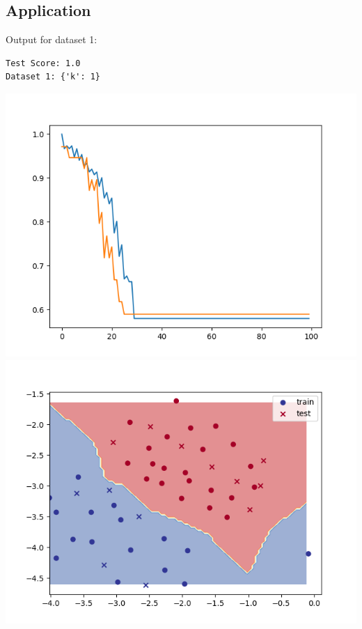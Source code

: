     \subsection{Application}
    Output for dataset 1:
    \begin{verbatim}
Test Score: 1.0
Dataset 1: {'k': 1}
    \end{verbatim}
    \includegraphics[width=\textwidth / 2]{plots/kmeans_loss_1}
    \includegraphics[width=\textwidth / 2]{plots/kmeans_boundary_1}

